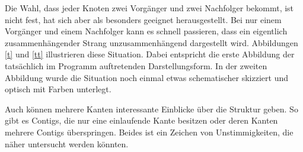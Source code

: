 Die Wahl, dass jeder Knoten zwei Vorgänger und zwei Nachfolger bekommt, ist nicht fest, hat sich aber als besonders geeignet herausgestellt. Bei nur einem Vorgänger und einem Nachfolger kann es schnell passieren, dass ein eigentlich zusammenhängender Strang unzusammenhängend dargestellt wird. Abbildungen \ref{t} und \ref{tt} illustrieren diese Situation. Dabei entspricht die erste Abbildung der tatsächlich im Programm auftretenden Darstellungsform. In der zweiten Abbildung wurde die Situation noch einmal etwas schematischer skizziert und optisch mit Farben unterlegt.

Auch können mehrere Kanten interessante Einblicke über die Struktur geben. So gibt es Contigs, die nur eine einlaufende Kante besitzen oder deren Kanten mehrere Contigs überspringen. 
Beides ist ein Zeichen von Unstimmigkeiten, die näher untersucht werden könnten.


